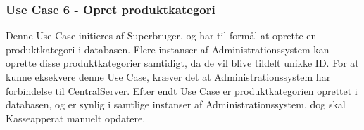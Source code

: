 \subsubsection{Use Case 6 - Opret produktkategori}
Denne Use Case initieres af Superbruger, og har til formål at oprette en produktkategori i databasen. Flere instanser af Administrationssystem kan oprette disse produktkategorier samtidigt, da de vil blive tildelt unikke ID. For at kunne eksekvere denne Use Case, kræver det at Administrationssystem har forbindelse til CentralServer. Efter endt Use Case er produktkategorien oprettet i databasen, og er synlig i samtlige instanser af Administrationssystem, dog skal Kasseapperat manuelt opdatere.